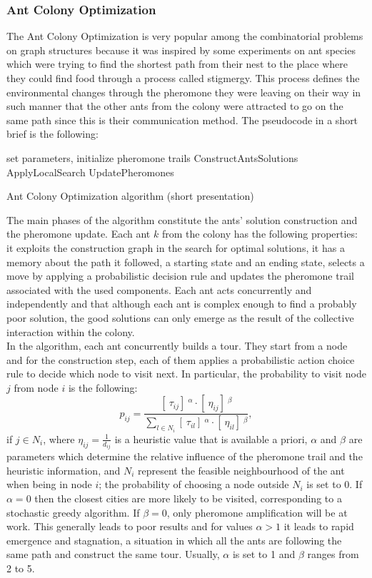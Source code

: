 \documentclass{article}
\begin{document}
\subsubsection{Ant Colony Optimization}
The Ant Colony Optimization is very popular among the combinatorial problems on graph structures because it was inspired by some experiments on ant species which were trying to find the shortest path from their nest to the place where they could find food through a process called stigmergy. This process defines the environmental changes through the pheromone they were leaving on their way in such manner that the other ants from the colony were attracted to go on the same path since this is their communication method.
The pseudocode in a short brief is the following:\\
\begin{algorithm}[H]
\SetAlgoLined
    set parameters, initialize pheromone trails\;
    {
        ConstructAntsSolutions\;
        ApplyLocalSearch\;
        UpdatePheromones\;
    }
 \caption{Ant Colony Optimization algorithm (short presentation)}
\end{algorithm}
The main phases of the algorithm constitute the ants' solution construction and the pheromone update. Each ant $k$ from the colony has the following properties: it exploits the construction graph in the search for optimal solutions, it has a memory about the path it followed, a starting state and an ending state, selects a move by applying a probabilistic decision rule and updates the pheromone trail associated with the used components. Each ant acts concurrently and independently and that although each ant is complex enough to find a probably poor solution, the good solutions can only emerge as the result of the collective interaction within the colony.\\
In the algorithm, each ant concurrently builds a tour. They start from a node and for the construction step, each of them applies a probabilistic action choice rule to decide which node to visit next. In particular, the probability to visit node $j$ from node $i$ is the following:
$$p_{ij} = \frac{[\ \tau_{ij} ] \ ^{\alpha} \cdot [\ \eta_{ij}]\ ^ {\beta}}{\sum_{l \in N_i} [\ \tau_{il} ] \ ^ {\alpha} \cdot [\ \eta_{il}]\ ^ {\beta}},$$
if $j \in N_i$, where $\eta_{ij} = \frac{1}{d_{ij}}$ is a heuristic value that is available a priori, $\alpha$ and $\beta$ are parameters which determine the relative influence of the pheromone trail and the heuristic information, and $N_i$ represent the feasible neighbourhood of the ant when being in node $i$; the probability of choosing a node outside $N_i$ is set to 0. If $\alpha = 0$ then the closest cities are more likely to be visited, corresponding to a stochastic greedy algorithm. If $\beta = 0$, only pheromone amplification will be at work. This generally leads to poor results and for values $\alpha > 1$ it leads to rapid emergence and stagnation, a situation in which all the ants are following the same path and construct the same tour. Usually, $\alpha$ is set to 1 and $\beta$ ranges from 2 to 5.\\
\end{document}
